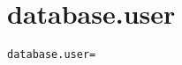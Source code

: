 \section{database.user}
\label{configuration:DatabaseUser}
\ClearAPI
\TODO
{}
\begin{lstlisting}[style=Props,caption={Usage example for \textit{database.user}}]
database.user=
\end{lstlisting}